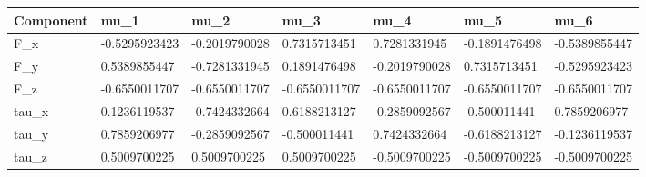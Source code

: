 \begin{tabular}{@{}lllllll@{}}
\toprule
Component & mu\_1 & mu\_2 & mu\_3 & mu\_4 & mu\_5 & mu\_6 \\
\midrule
F\_x & -0.5295923423 & -0.2019790028 & 0.7315713451 & 0.7281331945 & -0.1891476498 & -0.5389855447 \\
F\_y & 0.5389855447 & -0.7281331945 & 0.1891476498 & -0.2019790028 & 0.7315713451 & -0.5295923423 \\
F\_z & -0.6550011707 & -0.6550011707 & -0.6550011707 & -0.6550011707 & -0.6550011707 & -0.6550011707 \\
tau\_x & 0.1236119537 & -0.7424332664 & 0.6188213127 & -0.2859092567 & -0.500011441 & 0.7859206977 \\
tau\_y & 0.7859206977 & -0.2859092567 & -0.500011441 & 0.7424332664 & -0.6188213127 & -0.1236119537 \\
tau\_z & 0.5009700225 & 0.5009700225 & 0.5009700225 & -0.5009700225 & -0.5009700225 & -0.5009700225 \\
\bottomrule
\end{tabular}
